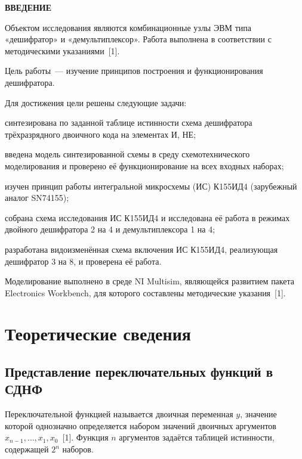 \documentclass[14pt,a4paper]{extarticle}
\newcommand{\structsection}[1]{%
  \clearpage
  \phantomsection
  \addcontentsline{toc}{section}{#1}%
  \begin{center}\textbf{#1}\end{center}\vspace{6pt}}
\begin{document}
\structsection{ВВЕДЕНИЕ}

Объектом исследования являются комбинационные узлы ЭВМ типа «дешифратор» и «демультиплексор». Работа выполнена в соответствии с методическими указаниями~[1].

Цель работы~--- изучение принципов построения и функционирования дешифратора.

Для достижения цели решены следующие задачи:
\begin{gostlist}
\item синтезирована по заданной таблице истинности схема дешифратора трёхразрядного двоичного кода на элементах И, НЕ;
\item введена модель синтезированной схемы в среду схемотехнического моделирования и проверено её функционирование на всех входных наборах;
\item изучен принцип работы интегральной микросхемы (ИС) К155ИД4 (зарубежный аналог SN74155);
\item собрана схема исследования ИС К155ИД4 и исследована её работа в режимах двойного дешифратора 2 на 4 и демультиплексора 1 на 4;
\item разработана видоизменённая схема включения ИС К155ИД4, реализующая дешифратор 3 на 8, и проверена её работа.
\end{gostlist}

Моделирование выполнено в среде NI Multisim, являющейся развитием пакета Electronics Workbench, для которого составлены методические указания~[1].

\clearpage
\section{Теоретические сведения}

\subsection{Представление переключательных функций в СДНФ}

Переключательной функцией называется двоичная переменная $y$, значение которой однозначно определяется набором значений двоичных аргументов $x_{n-1}, \ldots, x_1, x_0$~[1]. Функция $n$ аргументов задаётся таблицей истинности, содержащей $2^n$ наборов.
\end{document}
